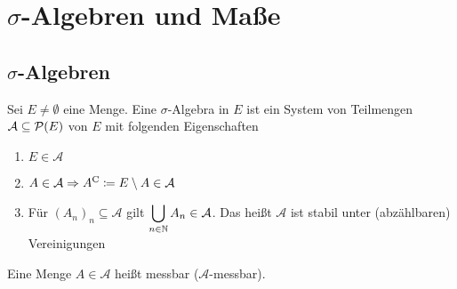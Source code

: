 \section{$\sigma$-Algebren und Maße}

\subsection{$\sigma$-Algebren}
\thispagestyle{pagenumberonly}

\begin{definition}
    Sei $E\neq \emptyset$ eine Menge. Eine $\sigma$-Algebra in $E$ ist ein System von Teilmengen $\mathcal{A} \subseteq \mathcal{P}\of{E}$ von $E$ mit folgenden Eigenschaften
    \begin{enumerate}[label=($\Sigma_{\arabic*}$)]
        \item $E\in\mathcal{A}$
        \item $A\in\mathcal{A} \Rightarrow{} A^{\mathrm{C}} \coloneqq E \setminus A \in\mathcal{A}$
        \item Für $(A_n)_n\subseteq\mathcal{A}$ gilt $\displaystyle\bigcup_{n\in\mathbb{N}} A_n \in\mathcal{A}$. Das heißt $\mathcal{A}$ ist stabil unter (abzählbaren) Vereinigungen
    \end{enumerate}
    Eine Menge $A\in\mathcal{A}$ heißt messbar ($\mathcal{A}$-messbar).
\end{definition}

